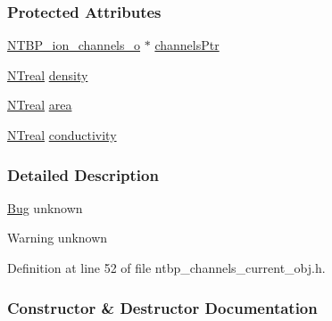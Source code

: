 \subsubsection*{Protected Attributes}
\begin{DoxyCompactItemize}
\item 
\hyperlink{class_n_t_b_p__ion__channels__o}{NTBP\_\-ion\_\-channels\_\-o} $\ast$ \hyperlink{class_n_t_b_p__channels__current__o_a7adaf14a8cc866ae997da8414b864b00}{channelsPtr}
\item 
\hyperlink{nt__types_8h_a814a97893e9deb1eedcc7604529ba80d}{NTreal} \hyperlink{class_n_t_b_p__channels__current__o_a8f486ec47e3aeef298a33b735758aa9f}{density}
\item 
\hyperlink{nt__types_8h_a814a97893e9deb1eedcc7604529ba80d}{NTreal} \hyperlink{class_n_t_b_p__channels__current__o_af88f0d6c8df84ab148c87484f39ee2b7}{area}
\item 
\hyperlink{nt__types_8h_a814a97893e9deb1eedcc7604529ba80d}{NTreal} \hyperlink{class_n_t_b_p__channels__current__o_a9e93074869bcaabf578ca447196cccbb}{conductivity}
\end{DoxyCompactItemize}


\subsubsection{Detailed Description}
\begin{Desc}
\item[\hyperlink{bug__bug000053}{Bug}]unknown \end{Desc}
\begin{DoxyWarning}{Warning}
unknown 
\end{DoxyWarning}


Definition at line 52 of file ntbp\_\-channels\_\-current\_\-obj.h.



\subsubsection{Constructor \& Destructor Documentation}
